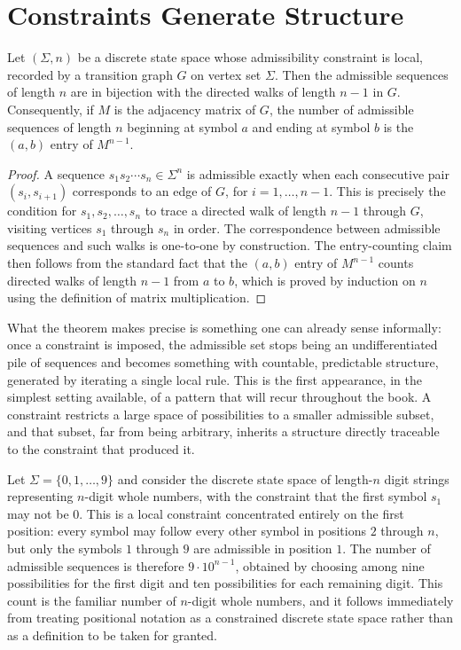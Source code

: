 \section{Constraints Generate Structure}

\begin{theorem}
Let $(\Sigma, n)$ be a discrete state space whose admissibility constraint is
local, recorded by a transition graph $G$ on vertex set $\Sigma$. Then the
admissible sequences of length $n$ are in bijection with the directed walks of
length $n-1$ in $G$. Consequently, if $M$ is the adjacency matrix of $G$, the
number of admissible sequences of length $n$ beginning at symbol $a$ and
ending at symbol $b$ is the $(a,b)$ entry of $M^{n-1}$.
\end{theorem}

\begin{proof}
A sequence $s_1 s_2 \cdots s_n \in \Sigma^n$ is admissible exactly when each
consecutive pair $(s_i, s_{i+1})$ corresponds to an edge of $G$, for
$i = 1, \dots, n-1$. This is precisely the condition for $s_1, s_2, \dots,
s_n$ to trace a directed walk of length $n-1$ through $G$, visiting vertices
$s_1$ through $s_n$ in order. The correspondence between admissible sequences
and such walks is one-to-one by construction. The entry-counting claim then
follows from the standard fact that the $(a,b)$ entry of $M^{n-1}$ counts
directed walks of length $n-1$ from $a$ to $b$, which is proved by induction
on $n$ using the definition of matrix multiplication.
\end{proof}

What the theorem makes precise is something one can already sense
informally: once a constraint is imposed, the admissible set stops being an
undifferentiated pile of sequences and becomes something with countable,
predictable structure, generated by iterating a single local rule. This is
the first appearance, in the simplest setting available, of a pattern that
will recur throughout the book. A constraint restricts a large space of
possibilities to a smaller admissible subset, and that subset, far from being
arbitrary, inherits a structure directly traceable to the constraint that
produced it.

\begin{example}
Let $\Sigma = \{0, 1, \dots, 9\}$ and consider the discrete state space of
length-$n$ digit strings representing $n$-digit whole numbers, with the
constraint that the first symbol $s_1$ may not be $0$. This is a local
constraint concentrated entirely on the first position: every symbol may
follow every other symbol in positions $2$ through $n$, but only the symbols
$1$ through $9$ are admissible in position $1$. The number of admissible
sequences is therefore $9 \cdot 10^{n-1}$, obtained by choosing among nine
possibilities for the first digit and ten possibilities for each remaining
digit. This count is the familiar number of $n$-digit whole numbers, and it
follows immediately from treating positional notation as a constrained
discrete state space rather than as a definition to be taken for granted.
\end{example}

